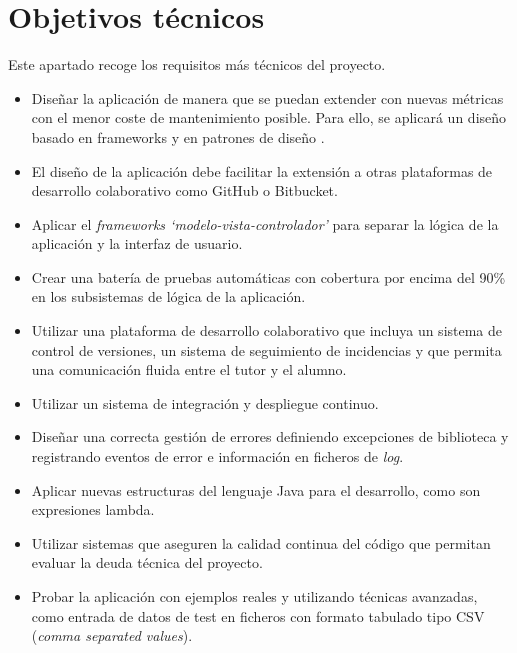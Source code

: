 \section{Objetivos técnicos}
Este apartado recoge los requisitos más técnicos del proyecto.
\begin{itemize}
	\tightlist
	\item Diseñar la aplicación de manera que se puedan extender con nuevas métricas con el menor coste de mantenimiento posible. Para ello, se aplicará un diseño basado en frameworks y en patrones de diseño \citep{gamma_patrones_2002}.
	\item El diseño de la aplicación debe facilitar la extensión a otras plataformas de desarrollo colaborativo como GitHub o Bitbucket.
	\item Aplicar el \textit{frameworks `modelo-vista-controlador'} para separar la lógica de la aplicación y la interfaz de usuario.
	\item Crear una batería de pruebas automáticas con cobertura por encima del 90\% en los subsistemas de lógica de la aplicación.
	\item Utilizar una plataforma de desarrollo colaborativo que incluya un sistema de control de versiones, un sistema de seguimiento de incidencias y que permita una comunicación fluida entre el tutor y el alumno.
	\item Utilizar un sistema de integración y despliegue continuo.
	\item Diseñar una correcta gestión de errores definiendo excepciones de biblioteca y registrando eventos de error e información en ficheros de \textit{log}. 
	\item Aplicar nuevas estructuras  del lenguaje Java para el desarrollo, como son expresiones lambda. 
	\item Utilizar sistemas que aseguren la calidad continua del código que permitan evaluar la deuda técnica del proyecto.
	\item Probar la aplicación con ejemplos reales y utilizando técnicas avanzadas, como entrada de datos de test en ficheros con formato tabulado tipo CSV (\textit{comma separated values}). 	
\end{itemize}
